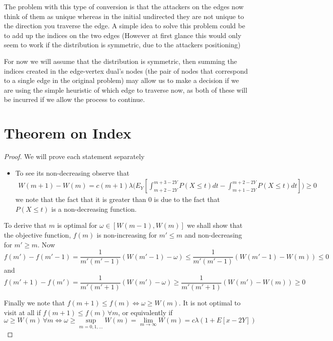 \documentclass[a4paper,10pt]{article}
\theoremstyle{definition}
\theoremstyle{definition}
\theoremstyle{remark}
\theoremstyle{definition}
\begin{document}
The problem with this type of conversion is that the attackers on the edges now think of them as unique whereas in the initial undirected they are not unique to the direction you traverse the edge. A simple idea to solve this problem could be to add up the indices on the two edges (However at first glance this would only seem to work if the distribution is symmetric, due to the attackers positioning)
 
For now we will assume that the distribution is symmetric, then summing the indices created in the edge-vertex dual's nodes (the pair of nodes that correspond to a single edge in the original problem) may allow us to make a decision if we are using the simple heuristic of which edge to traverse now, as both of these will be incurred if we allow the process to continue.



\appendix
{}
\appendixpage
\addappheadtotoc

\section{Theorem on Index}
\label{Appendix: theorem on index}
\begin{proof}
We will prove each statement separately
\begin{itemize}
\item To see its non-decreasing observe that
\begin{align*}
W(m+1)-W(m)= c(m+1) \lambda \Bigg(E_{Y} \left[\int_{m+2-2Y}^{m+3-2Y} P(X \leq t) dt -\int_{m+1-2Y}^{m+2-2Y} P(X \leq t)dt \right] \Bigg) \geq 0
\end{align*}
we note that the fact that it is greater than 0 is due to the fact that $P(X \leq t )$ is a non-decreasing function.
\end{itemize}

\item To derive that $m$ is optimal for $\omega \in [W(m-1),W(m)]$ we shall show that the objective function, $f(m)$ is non-increasing for $m' \leq m$ and non-decreasing for $m' \geq m$.
Now 
$$f(m')-f(m'-1)=\frac{1}{m'(m'-1)} (W(m'-1)-\omega) \leq \frac{1}{m'(m'-1)} (W(m'-1)-W(m)) \leq 0$$
and
$$f(m'+1)-f(m')=\frac{1}{m'(m'+1)} (W(m') -\omega) \geq \frac{1}{m'(m'+1)} (W(m')-W(m)) \geq 0$$

\item Finally we note that $f(m+1) \leq f(m) \iff \omega \geq W(m)$. It is not optimal to visit at all if $f(m+1) \leq f(m) \, \forall m$, or equivalently
if $$\omega \geq W(m) \, \forall m \iff \omega \geq \sup\limits_{m=0,1,...} W(m)=\lim\limits_{m \rightarrow \infty} W(m)=c \lambda (1+ E[x-2Y])$$
\end{proof}
\end{document}
